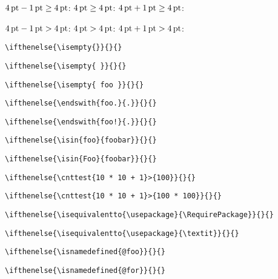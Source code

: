 \documentclass{article}
\makeatletter
\newcommand*{\cmd}[1]{\tex{\textbackslash #1}}
\newcommand*{\tex}{\texttt}
\newcommand*{\1}{$_1\m@th$}
\newcommand*{\2}{$_2\m@th$}
\makeatother
\begin{document}
\begin{list}{}
$4\pt - 1\pt\geq 4\pt$: \ifthenelse{\dimtest{4\pt - 1\pt}{>=}{4\pt}}{\TRUE}{\FALSE}\quad
$4\pt\geq 4\pt$:     \ifthenelse{\dimtest{4\pt}{>=}{4\pt}}{\TRUE}{\FALSE}\quad
$4\pt + 1\pt\geq 4\pt$: \ifthenelse{\dimtest{4\pt + 1\pt}{>=}{4\pt}}{\TRUE}{\FALSE}

$4\pt - 1\pt> 4\pt$: \ifthenelse{\dimtest{4\pt - 1\pt}{>}{4\pt}}{\TRUE}{\FALSE}\quad
$4\pt> 4\pt$:     \ifthenelse{\dimtest{4\pt}{>}{4\pt}}{\TRUE}{\FALSE}\quad
$4\pt + 1\pt> 4\pt$: \ifthenelse{\dimtest{4\pt + 1\pt}{>}{4\pt}}{\TRUE}{\FALSE}

\medskip

\tex{\cmd{ifthenelse}\{\cmd{isempty}\{\}\}\{\TRUE\}\{\FALSE\}}
\ifthenelse{\isempty{}}{\TRUE}{\FALSE}

\tex{\cmd{ifthenelse}\{\cmd{isempty}\{ \}\}\{\TRUE\}\{\FALSE\}}
\ifthenelse{\isempty{ }}{\TRUE}{\FALSE}

\tex{\cmd{ifthenelse}\{\cmd{isempty}\{ foo \}\}\{\TRUE\}\{\FALSE\}}

\medskip

\tex{\cmd{ifthenelse}\{\cmd{endswith}\{foo.\}\{.\}\}\{\TRUE\}\{\FALSE\}}

\tex{\cmd{ifthenelse}\{\cmd{endswith}\{foo!\}\{.\}\}\{\TRUE\}\{\FALSE\}}

\medskip

\tex{\cmd{ifthenelse}\{\cmd{isin}\{foo\}\{foobar\}\}\{\TRUE\}\{\FALSE\}}

\tex{\cmd{ifthenelse}\{\cmd{isin}\{Foo\}\{foobar\}\}\{\TRUE\}\{\FALSE\}}

\medskip

\tex{\cmd{ifthenelse}\{\cmd{cnttest}\{10 * 10 + 1\}>\{100\}\}\{\TRUE\}\{\FALSE\}}

\tex{\cmd{ifthenelse}\{\cmd{cnttest}\{10 * 10 + 1\}>\{100 * 100\}\}\{\TRUE\}\{\FALSE\}}

\medskip

\tex{\cmd{ifthenelse}\{\cmd{isequivalentto}\{\cmd{usepackage}\}\{\cmd{RequirePackage}\}\}\{\TRUE\}\{\FALSE\}}
\ifthenelse{\isequivalentto{\usepackage}{\RequirePackage}}{\TRUE}{\FALSE}

\tex{\cmd{ifthenelse}\{\cmd{isequivalentto}\{\cmd{usepackage}\}\{\cmd{textit}\}\}\{\TRUE\}\{\FALSE\}}
\ifthenelse{\isequivalentto{\usepackage}{\textit}}{\TRUE}{\FALSE}

\medskip

\tex{\cmd{ifthenelse}\{\cmd{isnamedefined}\{@foo\}\}\{\TRUE\}\{\FALSE\}}

\tex{\cmd{ifthenelse}\{\cmd{isnamedefined}\{@for\}\}\{\TRUE\}\{\FALSE\}}
\end{list}
\end{document}

